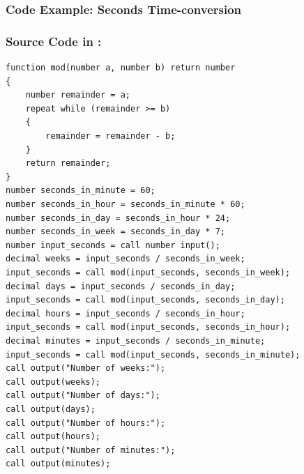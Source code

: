 \subsubsection{Code Example: Seconds Time-conversion} \label{acc_test_Seconds}

\subsubsection{Source Code in \lang:}
\begin{lstlisting}[language = scriptkid, firstnumber=1, label={list:acceptance_test_timeconversion_input}, caption=Acceptance test input of the timeconversion code example]
function mod(number a, number b) return number
{ 
    number remainder = a; 
    repeat while (remainder >= b) 
    { 
        remainder = remainder - b; 
    } 
    return remainder; 
} 
number seconds_in_minute = 60; 
number seconds_in_hour = seconds_in_minute * 60; 
number seconds_in_day = seconds_in_hour * 24; 
number seconds_in_week = seconds_in_day * 7; 
number input_seconds = call number input(); 
decimal weeks = input_seconds / seconds_in_week; 
input_seconds = call mod(input_seconds, seconds_in_week); 
decimal days = input_seconds / seconds_in_day; 
input_seconds = call mod(input_seconds, seconds_in_day); 
decimal hours = input_seconds / seconds_in_hour; 
input_seconds = call mod(input_seconds, seconds_in_hour); 
decimal minutes = input_seconds / seconds_in_minute; 
input_seconds = call mod(input_seconds, seconds_in_minute); 
call output("Number of weeks:"); 
call output(weeks); 
call output("Number of days:"); 
call output(days); 
call output("Number of hours:"); 
call output(hours);
call output("Number of minutes:"); 
call output(minutes); 
\end{lstlisting}

